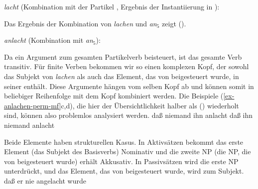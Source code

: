 \ea
\begin{minipage}[t]{\linewidth}
\emph{lacht} (Kombination mit der Partikel \anf, Ergebnis der Instantiierung in \subcat):\\
\end{minipage}
\z
Das Ergebnis der Kombination von \emph{lachen} und {\em an$_5$\/} zeigt ().

\eas
\emph{anlacht} (Kombination mit {\em an$_5$\/}):\\
\zs

\noindent
Da \anf ein Argument zum gesamten Partikelverb beisteuert, ist das gesamte Verb transitiv.
Für finite Verben bekommen wir so einen komplexen Kopf, der sowohl das Subjekt von \emph{lachen}
als auch das Element, das von \anf beigesteuert wurde, in seiner \subcatl enthält.
Diese Argumente hängen vom selben Kopf ab und können somit in beliebiger Reihenfolge
mit dem Kopf kombiniert werden. Die Beispiele (\ref{ex-anlachen-perm-mf}c,d), die hier
der Übersichtlichkeit halber als () wiederholt sind, können also problemlos analysiert werden.
\eal
\ex
daß    niemand           ihn           anlacht
\ex
daß    ihn           niemand          anlacht
\zl

\noindent
Beide Elemente haben strukturellen Kasus. In Aktivsätzen bekommt das erste Element (das Subjekt des Basisverbs)
Nominativ und die zweite NP (die NP, die von \anf beigesteuert wurde) erhält Akkusativ.
In Passivsätzen wird die erste NP unterdrückt, und das Element, das von \anf beigesteuert wurde,
wird zum Subjekt.
\ea
daß    er       nie   angelacht          wurde
\z

